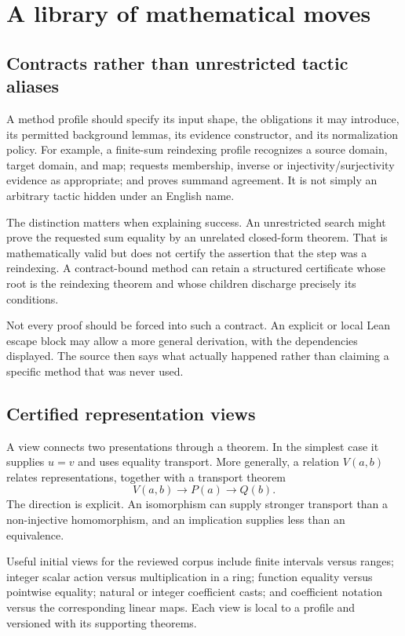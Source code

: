 \documentclass[11pt,a4paper]{article}
\begin{document}
\section{A library of mathematical moves}
\label{sec:methods}

\subsection{Contracts rather than unrestricted tactic aliases}

A method profile should specify its input shape, the obligations it may introduce, its permitted background lemmas, its evidence constructor, and its normalization policy. For example, a finite-sum reindexing profile recognizes a source domain, target domain, and map; requests membership, inverse or injectivity/surjectivity evidence as appropriate; and proves summand agreement. It is not simply an arbitrary tactic hidden under an English name.

The distinction matters when explaining success. An unrestricted search might prove the requested sum equality by an unrelated closed-form theorem. That is mathematically valid but does not certify the assertion that the step was a reindexing. A contract-bound method can retain a structured certificate whose root is the reindexing theorem and whose children discharge precisely its conditions.

Not every proof should be forced into such a contract. An explicit \texttt{} or local Lean escape block may allow a more general derivation, with the dependencies displayed. The source then says what actually happened rather than claiming a specific method that was never used.

\subsection{Certified representation views}

A view connects two presentations through a theorem. In the simplest case it supplies $u=v$ and uses equality transport. More generally, a relation $V(a,b)$ relates representations, together with a transport theorem
\[
 V(a,b)\to P(a)\to Q(b).
\]
The direction is explicit. An isomorphism can supply stronger transport than a non-injective homomorphism, and an implication supplies less than an equivalence.

Useful initial views for the reviewed corpus include finite intervals versus ranges; integer scalar action versus multiplication in a ring; function equality versus pointwise equality; natural or integer coefficient casts; and coefficient notation versus the corresponding linear maps. Each view is local to a profile and versioned with its supporting theorems.
\end{document}
